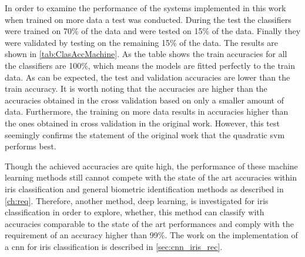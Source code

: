 In order to examine the performance of the systems implemented in this work when trained on more data a test was conducted. During the test the classifiers were trained on 70\% of the data and were tested on 15\% of the data. Finally they were validated by testing on the remaining 15\% of the data. The results are shown in \autoref{tab:ClasAccMachine}. As the table shows the train accuracies for all the classifiers are 100\%, which means the models are fitted perfectly to the train data. As can be expected, the test and validation accuracies are lower than the train accuracy. It is worth noting that the accuracies are higher than the accuracies obtained in the cross validation based on only a smaller amount of data. Furthermore, the training on more data results in accuracies higher than the ones obtained in cross validation in the original work. However, this test seemingly confirms the statement of the original work that the quadratic \gls{svm} performs best.

Though the achieved accuracies are quite high, the performance of these machine learning methods still cannot compete with the state of the art accuracies within iris classification and general biometric identification methods as described in \autoref{ch:req}. Therefore, another method, deep learning, is investigated for iris classification in order to explore, whether, this method can classify with accuracies comparable to the state of the art performances and comply with the requirement of an accuracy higher than 99\%. The work on the implementation of a \gls{cnn} for iris classification is described in \autoref{sec:cnn_iris_rec}.











